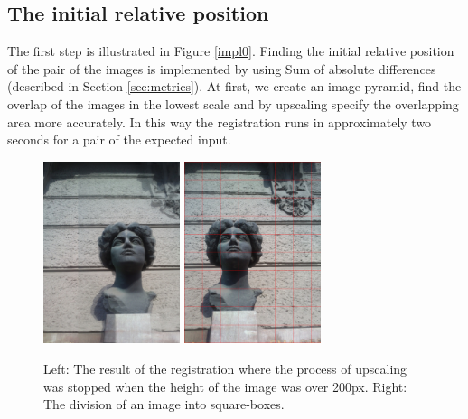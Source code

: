 \subsection{The initial relative position}
The first step is illustrated in Figure \ref{impl0}.
Finding the initial relative position of the pair of the images is implemented by using Sum of absolute differences (described in Section \ref{sec:metrics}).
At first, we create an image pyramid, find the overlap of the images in the lowest scale and by upscaling specify the overlapping area more accurately.
In this way the registration runs in approximately two seconds for a pair of the expected input.

\begin{figure}[H]
\centerline{
\includegraphics[width=4.0cm]{img/ema_overlap.png}
\includegraphics[width=4.0cm]{img/ema_buckets.png}}
\caption{Left: The result of the registration where the process of upscaling was stopped when the height of the image was over 200px. Right: The division of an image into square-boxes.}
\label{fig:overlap_and_buckets}
\end{figure}

